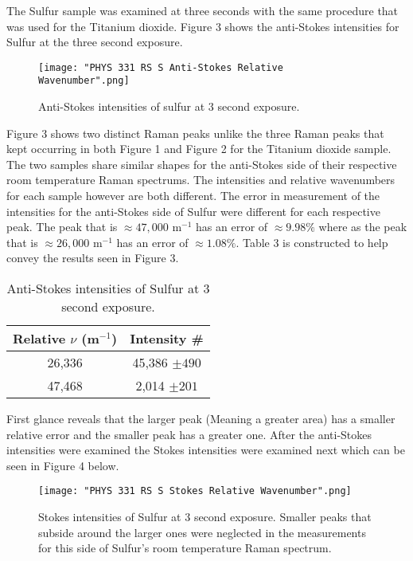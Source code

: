 \documentclass[twocolumn]{article}
\begin{document}
The Sulfur sample was examined at three seconds with the same procedure that was used for the Titanium dioxide. Figure 3 shows the anti-Stokes intensities for Sulfur at the three second exposure.
\begin{figure}[htbp]
\begin{center}
\texttt{[image: "PHYS 331 RS S Anti-Stokes Relative Wavenumber".png]}
\caption{Anti-Stokes intensities of sulfur at 3 second exposure.}
\label{default}
\end{center}
\end{figure}
\newline
Figure 3 shows two distinct Raman peaks unlike the three Raman peaks that kept occurring in both Figure 1 and Figure 2 for the Titanium dioxide sample. The two samples share similar shapes for the anti-Stokes side of their respective room temperature Raman spectrums. The intensities and relative wavenumbers for each sample however are both different. The error in measurement of the intensities for the anti-Stokes side of Sulfur were different for each respective peak.  The peak that is $\approx 47,000$ m$^{-1}$ has an error of $\approx 9.98\%$ where as the peak that is $\approx 26,000$ m$^{-1}$ has an error of $\approx 1.08\%$. Table 3 is constructed to help convey the results seen in Figure 3. 
\begin{table}[htp]
\begin{center}
\begin{tabular}{|c|c|}
    \hline \textbf{Relative $\nu$ (m$^{-1}$)} & \textbf{Intensity \#} \\ \hline
    26,336 & 45,386 $\pm 490$ \\ \hline
    47,468 & 2,014 $\pm 201$ \\ \hline
\end{tabular}
\caption{Anti-Stokes intensities of Sulfur at 3 second exposure.}
\end{center}
\label{default}
\end{table}%
\newline
First glance reveals that the larger peak (Meaning a greater area) has a smaller relative error and the smaller peak has a greater one. After the anti-Stokes intensities were examined the Stokes intensities were examined next which can be seen in Figure 4 below.
\begin{figure}[htbp]
\begin{center}
\texttt{[image: "PHYS 331 RS S Stokes Relative Wavenumber".png]}
\caption{Stokes intensities of Sulfur at 3 second exposure. Smaller peaks that subside around the larger ones were neglected in the measurements for this side of 
Sulfur's room temperature Raman spectrum.}
\label{default}
\end{center}
\end{figure}
\end{document}
